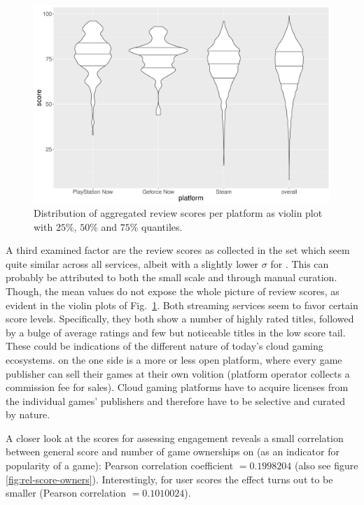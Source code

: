 \begin{figure}[!t]
	\centering
	\includegraphics[width=1.0\columnwidth]{images/scores-by-platform-violin.pdf}
	\caption{Distribution of aggregated review scores per platform as violin plot with $25\%$, $50\%$ and $75\%$ quantiles.}
\label{fig:scores-by-platform}
\end{figure}

A third examined factor are the review scores as collected in the \metacritic set which seem quite similar across all services, albeit with a slightly lower $\sigma$ for \gfnow. This can probably be attributed to both the small scale and through manual curation. Though, the mean values do not expose the whole picture of review scores, as evident in the violin plots of Fig.~\ref{fig:scores-by-platform}. Both streaming services seem to favor certain score levels. Specifically, they both show a number of highly rated titles, followed by a bulge of average ratings and few but noticeable titles in the low score tail. These could be indications of the different nature of today's cloud gaming ecosystems. \steam on the one side is a more or less open platform, where every game publisher can sell their games at their own volition (platform operator collects a commission fee for sales). Cloud gaming platforms have to acquire licenses from the individual games' publishers and therefore have to be selective and curated by nature. 

A closer look at the \metacritic scores for assessing engagement reveals a small correlation between general score and number of game ownerships on \steam (as an indicator for popularity of a game): Pearson correlation coefficient $= 0.1998204$ (also see figure \ref{fig:rel-score-owners}). Interestingly, for \metacritic user scores the effect turns out to be smaller (Pearson correlation $= 0.1010024$). 

